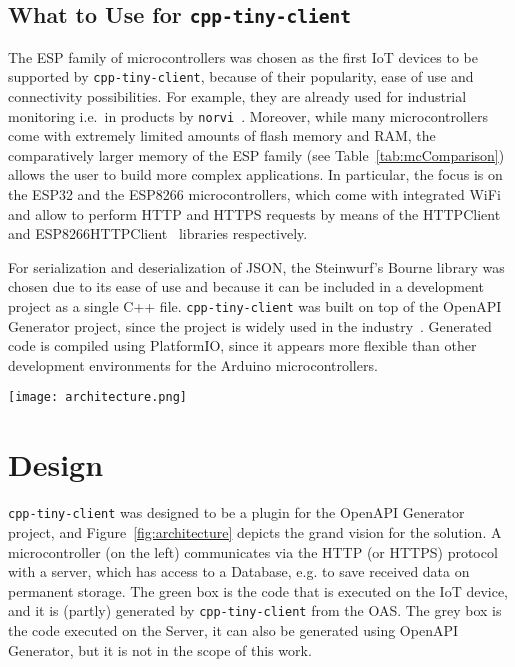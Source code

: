 \documentclass[manuscript,screen]{acmart}
\begin{document}
\subsection{What to Use for \texttt{cpp-tiny-client}}
The ESP family of microcontrollers was chosen as the first IoT devices to be supported by \texttt{cpp-tiny-client}, because of their popularity, ease of use and connectivity possibilities. For example, they are already used for industrial monitoring i.e.\ in products by \texttt{norvi}~\cite{norviCorp}.
%
Moreover, while many microcontrollers come with extremely limited amounts of flash memory and RAM, the comparatively larger memory of the ESP family (see Table~\ref{tab:mcComparison}) allows the user to build more complex applications. 
%
In particular, the focus is on the ESP32 and the ESP8266 microcontrollers, which come with integrated WiFi and allow to perform HTTP and HTTPS requests by means of the HTTPClient~\cite{Esp32HTTPClient} and ESP8266HTTPClient~\cite{Esp8266HTTPClient} libraries respectively. 

For serialization and deserialization of JSON, the Steinwurf's Bourne library was chosen due to its ease of use and because it can be included in a development project as a single C++ file. 
%
\texttt{cpp-tiny-client} was built on top of the OpenAPI Generator project, since the project is widely used in the industry~\cite{OpenAPIGeneratorUsers}. 
%
Generated code is compiled using PlatformIO, since it appears more flexible than other development environments for the Arduino microcontrollers. 





\begin{figure*}[t!]
    \centering
    \texttt{[image: architecture.png]}
    \caption{Architecture of client (green) and server (grey) system using the HTTP protocol}
    \label{fig:architecture}
\end{figure*}


\section{Design}\label{sec:design}

\texttt{cpp-tiny-client} was designed to be a plugin for the OpenAPI Generator project, and 
Figure~\ref{fig:architecture} depicts the grand vision for the solution. A microcontroller (on the left) communicates via the HTTP (or HTTPS) protocol with a server, which has access to a Database, e.g. to save received data on permanent storage. 
The green box is the code that is executed on the IoT device, and it is (partly) generated by \texttt{cpp-tiny-client} from the OAS. The grey box is the code executed on the Server, it can also be generated using OpenAPI Generator, but it is not in the scope of this work. 
\end{document}
